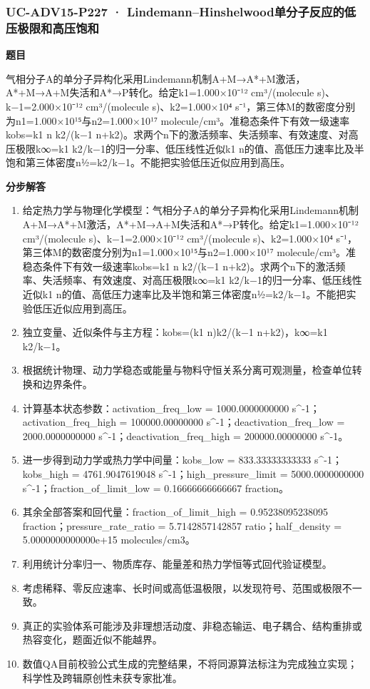\documentclass[UTF8,11pt,a4paper]{ctexart}
\begin{document}
\subsubsection*{UC-ADV15-P227 · Lindemann–Hinshelwood单分子反应的低压极限和高压饱和}
\noindent\textbf{题目}\par
气相分子A的单分子异构化采用Lindemann机制A+M→A*+M激活，A*+M→A+M失活和A*→P转化。给定k1=1.000×10⁻¹² cm³/(molecule s)、k−1=2.000×10⁻¹² cm³/(molecule s)、k2=1.000×10⁴ s⁻¹，第三体M的数密度分别为n1=1.000×10¹⁵与n2=1.000×10¹⁷ molecule/cm³。准稳态条件下有效一级速率kobs=k1 n k2/(k−1 n+k2)。求两个n下的激活频率、失活频率、有效速度、对高压极限k∞=k1 k2/k−1的归一分率、低压线性近似k1 n的值、高低压力速率比及半饱和第三体密度n½=k2/k−1。不能把实验低压近似应用到高压。\par
\medskip\noindent\textbf{分步解答}
\begin{enumerate}
\item 给定热力学与物理化学模型：气相分子A的单分子异构化采用Lindemann机制A+M→A*+M激活，A*+M→A+M失活和A*→P转化。给定k1=1.000×10⁻¹² cm³/(molecule s)、k−1=2.000×10⁻¹² cm³/(molecule s)、k2=1.000×10⁴ s⁻¹，第三体M的数密度分别为n1=1.000×10¹⁵与n2=1.000×10¹⁷ molecule/cm³。准稳态条件下有效一级速率kobs=k1 n k2/(k−1 n+k2)。求两个n下的激活频率、失活频率、有效速度、对高压极限k∞=k1 k2/k−1的归一分率、低压线性近似k1 n的值、高低压力速率比及半饱和第三体密度n½=k2/k−1。不能把实验低压近似应用到高压。
\item 独立变量、近似条件与主方程：kobs=(k1 n)k2/(k−1 n+k2)，k∞=k1 k2/k−1。
\item 根据统计物理、动力学稳态或能量与物料守恒关系分离可观测量，检查单位转换和边界条件。
\item 计算基本状态参数：activation\_freq\_low = 1000.0000000000 s\textasciicircum{}-1；activation\_freq\_high = 100000.00000000 s\textasciicircum{}-1；deactivation\_freq\_low = 2000.0000000000 s\textasciicircum{}-1；deactivation\_freq\_high = 200000.00000000 s\textasciicircum{}-1。
\item 进一步得到动力学或热力学中间量：kobs\_low = 833.33333333333 s\textasciicircum{}-1；kobs\_high = 4761.9047619048 s\textasciicircum{}-1；high\_pressure\_limit = 5000.0000000000 s\textasciicircum{}-1；fraction\_of\_limit\_low = 0.16666666666667 fraction。
\item 其余全部答案和回代量：fraction\_of\_limit\_high = 0.95238095238095 fraction；pressure\_rate\_ratio = 5.7142857142857 ratio；half\_density = 5.0000000000000e+15 molecules/cm3。
\item 利用统计分率归一、物质库存、能量差和热力学恒等式回代验证模型。
\item 考虑稀释、零反应速率、长时间或高低温极限，以发现符号、范围或极限不一致。
\item 真正的实验体系可能涉及非理想活动度、非稳态输运、电子耦合、结构重排或热容变化，题面近似不能越界。
\item 数值QA目前校验公式生成的完整结果，不将同源算法标注为完成独立实现；科学性及跨辑原创性未获专家批准。
\end{enumerate}
\end{document}
